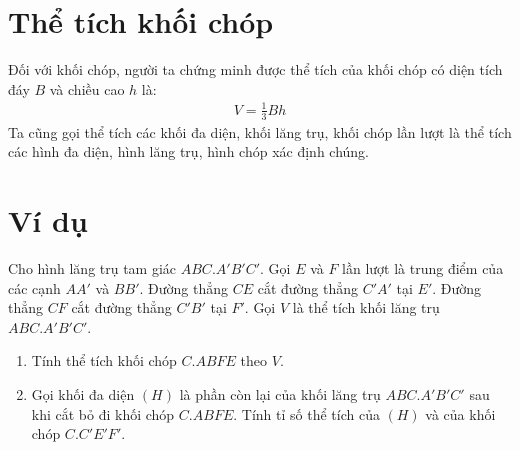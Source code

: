 \section{Thể tích khối chóp}
Đối với khối chóp, người ta chứng minh được thể tích của khối chóp có diện tích đáy \( B \) và chiều cao \( h \) là:
\begin{eqnarray}
    V = \frac{1}{3} Bh
\end{eqnarray}
Ta cũng gọi thể tích các khối đa diện, khối lăng trụ, khối chóp lần lượt là thể tích các hình đa diện, hình lăng trụ, hình chóp xác định chúng.

\section*{Ví dụ}
Cho hình lăng trụ tam giác $ABC.A'B'C'$. Gọi $E$ và $F$ lần lượt là trung điểm của các cạnh $AA'$ và $BB'$. Đường thẳng $CE$ cắt đường thẳng $C'A'$ tại $E'$. Đường thẳng $CF$ cắt đường thẳng $C'B'$ tại $F'$. Gọi $V$ là thể tích khối lăng trụ $ABC.A'B'C'$.

\begin{enumerate}[label=(\alph*)]
    \item Tính thể tích khối chóp $C.ABFE$ theo $V$.
    \item Gọi khối đa diện $(H)$ là phần còn lại của khối lăng trụ $ABC.A'B'C'$ sau khi cắt bỏ đi khối chóp $C.ABFE$. Tính tỉ số thể tích của $(H)$ và của khối chóp $C.C'E'F'$.
\end{enumerate}

